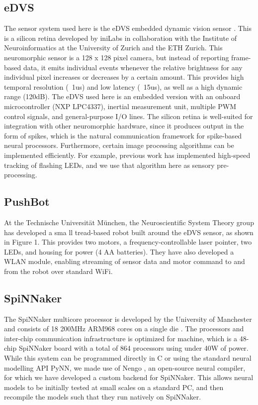 \documentclass[conference]{IEEEtran}
\begin{document}
\subsection{eDVS}
The sensor system used here is the eDVS embedded dynamic vision sensor \cite{conradt2009embedded}. This is a silicon retina developed by iniLabs in collaboration with the Institute of Neuroinformatics at the University of Zurich and the ETH Zurich. This neuromorphic sensor is a 128 x 128 pixel camera, but instead of reporting frame-based data, it emits individual events whenever the relative brightness for any individual pixel increases or decreases by a certain amount. This provides high temporal resolution (~1us) and low latency (~15us), as well as a high dynamic range (120dB). The eDVS used here is an embedded version with an onboard microcontroller (NXP LPC4337), inertial measurement unit, multiple PWM control signals, and general-purpose I/O lines. The silicon retina is well-suited for integration with other neuromorphic hardware, since it produces output in the form of spikes, which is the natural communication framework for spike-based neural processors. Furthermore, certain image processing algorithms can be implemented efficiently. For example, previous work \cite{muller2011miniature} has implemented high-speed tracking of flashing LEDs, and we use that algorithm here as sensory pre-processing.


\subsection{PushBot}
At the Technische Universit{\"a}t M{\"u}nchen, the Neuroscientific
System Theory group has developed a sma ll tread-based robot built around the eDVS sensor, as shown in Figure 1. This provides two motors, a frequency-controllable laser pointer, two LEDs, and housing for power (4 AA batteries). They have also developed a WLAN module, enabling
streaming of sensor data and motor command to and from the robot over standard WiFi.

\subsection{SpiNNaker}

The SpiNNaker multicore processor is developed by the University of Manchester and consists of 18 200MHz ARM968 cores on a single die \cite{furber2007neural, furber2014spinnaker}. The processors and inter-chip communication infrastructure is optimized for machine, which is a 48-chip SpiNNaker board with a total of 864 processors using under 40W of power. While this system can be programmed directly in C or using the standard neural modelling API PyNN, we made use of Nengo \cite{bekolay_nengo2014}, an open-source neural compiler, for which we have developed a custom backend for SpiNNaker. This allows neural models to be initially tested at small scales on a standard PC, and then recompile the models such that they
run natively on SpiNNaker.
\end{document}
